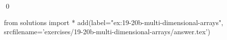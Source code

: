 
\begin{ex} 
  \label{ex:19-20b-multi-dimensional-arrays}
  
  \qed
\end{ex} 
\begin{python0}
from solutions import *
add(label="ex:19-20b-multi-dimensional-arrays",
    srcfilename='exercises/19-20b-multi-dimensional-arrays/answer.tex') 
\end{python0}
